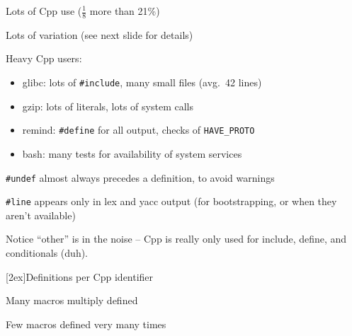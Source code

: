 \documentclass{slides}
\makeatletter
\def\slidetitle#1{\begin{center}\large #1 \end{center}}
\def\raisedslidetitle#1{\centerline{\raisebox{1.5in}[2ex]{\large #1}}}
\def\nopgbrk{\@nobreaktrue}
\makeatother
\begin{document}
\begin{note}
Lots of Cpp use ($\frac{1}{8}$ more than 21\%)

Lots of variation (see next slide for details)

Heavy Cpp users:
\vspace{-.5in}
\begin{itemize}\itemsep 0pt \parskip 0pt
\item glibc: lots of {\tt \#include}, many small files (avg.~42 lines)
\item gzip: lots of literals, lots of system calls
\item remind: {\tt \#define} for all output, checks of \verb|HAVE_PROTO|
\item bash: many tests for availability of system services
\end{itemize}

{\tt \#undef} almost always precedes a definition, to avoid warnings

{\tt \#line} appears only in lex and yacc output (for bootstrapping, or
when they aren't available)

Notice ``other'' is in the noise -- Cpp is really only used for include,
define, and conditionals (duh).
\end{note}


% 


\begin{slide}
\raisedslidetitle{Definitions per Cpp identifier}

\centerline{}

Many macros multiply defined

Few macros defined very many times
\end{slide}
\end{document}
